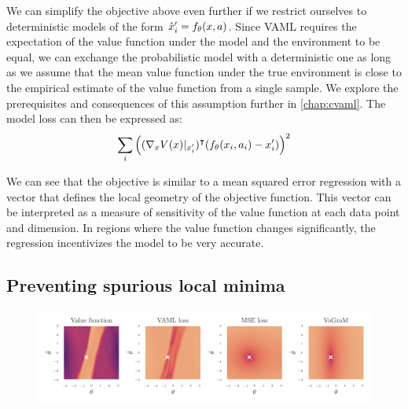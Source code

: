 We can simplify the objective above even further if we restrict ourselves to deterministic models of the form $\hat{x}'_i = f_\theta(x,a)$.
Since VAML requires the expectation of the value function under the model and the environment to be equal, we can exchange the probabilistic model with a deterministic one as long as we assume that the mean value function under the true environment is close to the empirical estimate of the value function from a single sample.
We explore the prerequisites and consequences of this assumption further in \autoref{chap:cvaml}.
The model loss can then be expressed as:
\begin{align}
    \sum_i {\left((\nabla_x V(x)|_{x'_i})^\intercal (f_\theta(x_i,a_i) - x'_i) \right)^2} \label{eq:taylor_vaml}
\end{align}

We can see that the objective is similar to a mean squared error regression with a vector that defines the local geometry of the objective function. This vector can be interpreted as a measure of sensitivity of the value function at each data point and dimension. In regions where the value function changes significantly, the regression incentivizes the model to be very accurate. 

\subsection{Preventing spurious local minima}
\begin{figure}[!t]
\centering
    \includegraphics[clip, trim=0.cm 0.5cm 0.cm 0.45cm, width=\textwidth]{figures/vagram/all_losses.pdf}
    \caption{}
    \label{fig:all_losses}
\end{figure}


